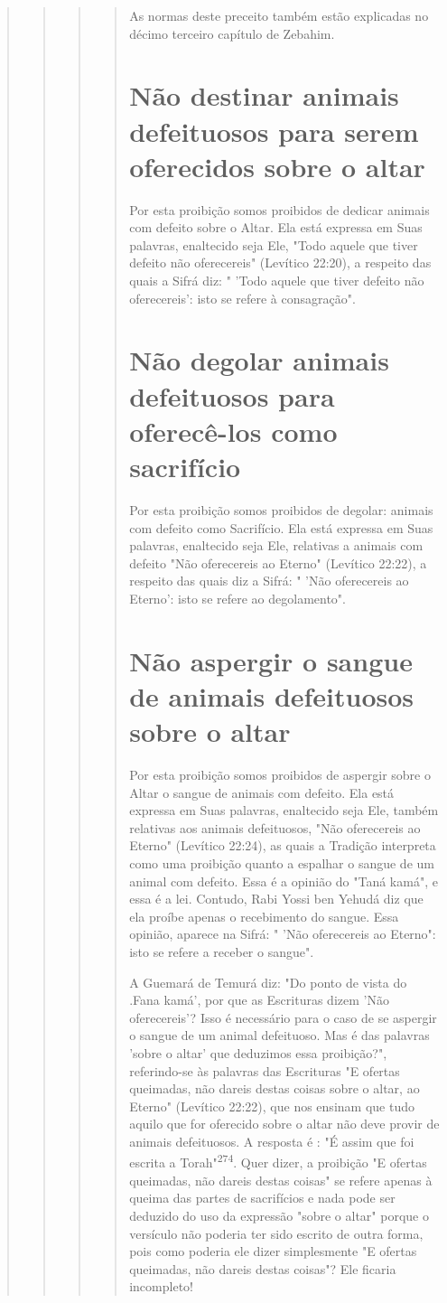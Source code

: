 \begin{quote}
\begin{quote}
\begin{quote}
\begin{quote}
As normas deste preceito também estão explicadas no décimo ter­ceiro
capítulo de Zebahim.

\section{Não destinar animais defeituosos para serem oferecidos sobre o altar}

Por esta proibição somos proibidos de dedicar animais com defeito sobre
o Altar. Ela está expressa em Suas palavras, enaltecido seja Ele, "Todo
aquele que tiver defeito não oferecereis" (Levítico 22:20), a respeito
das quais a Sifrá diz: " 'Todo aquele que tiver defeito não
oferecereis': isto se refere à consagração".

\section{Não degolar animais defeituosos para oferecê-los como sacrifício}

Por esta proibição somos proibidos de degolar: animais com defeito como
Sacrifício. Ela está expressa em Suas palavras, enaltecido seja Ele,
relativas a animais com defeito "Não oferecereis ao Eterno" (Levítico
22:22), a respeito das quais diz a Sifrá: " 'Não oferecereis ao Eterno':
isto se refere ao degolamento".


\section{Não aspergir o sangue de animais defeituosos sobre o altar}

Por esta proibição somos proibidos de aspergir sobre o Altar o san­gue
de animais com defeito. Ela está expressa em Suas palavras, enaltecido
seja Ele, também relativas aos animais defeituosos, "Não oferecereis ao
Eterno" (Le­vítico 22:24), as quais a Tradição interpreta como uma
proibição quanto a es­palhar o sangue de um animal com defeito. Essa é a
opinião do "Taná kamá", e essa é a lei. Contudo, Rabi Yossi ben Yehudá
diz que ela proíbe apenas o re­cebimento do sangue. Essa opinião,
aparece na Sifrá: " 'Não oferecereis ao Eter­no": isto se refere a
receber o sangue".

A Guemará de Temurá diz: "Do ponto de vista do .Fana
kamá', por que as Escrituras dizem 'Não oferecereis'? Isso é necessário
para o caso de se aspergir o sangue de um animal defeituoso. Mas é das
palavras 'sobre o altar' que deduzimos essa proibição?", referindo-se às
palavras das Escrituras "E ofertas queimadas, não dareis destas coisas
sobre o altar, ao Eterno" (Levítico 22:22), que nos ensinam que tudo
aquilo que for oferecido sobre o altar não deve pro­vir de animais
defeituosos. A resposta é : "É assim que foi escrita a
Torah"\textsuperscript{274}. Quer dizer, a proibição "E ofertas
queimadas, não dareis destas coisas" se refe­re apenas à queima das
partes de sacrifícios e nada pode ser deduzido do uso da expressão
"sobre o altar" porque o versículo não poderia ter sido escrito de outra
forma, pois como poderia ele dizer simplesmente "E ofertas queima­das,
não dareis destas coisas"? Ele ficaria incompleto!


\end{quote}
\end{quote}
\end{quote}
\end{quote}
